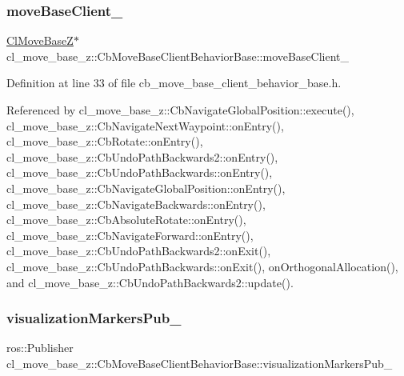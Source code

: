 \subsubsection{\texorpdfstring{move\+Base\+Client\+\_\+}{moveBaseClient\_}}
{\footnotesize\ttfamily \hyperlink{classcl__move__base__z_1_1ClMoveBaseZ}{Cl\+Move\+BaseZ}$\ast$ cl\+\_\+move\+\_\+base\+\_\+z\+::\+Cb\+Move\+Base\+Client\+Behavior\+Base\+::move\+Base\+Client\+\_\+\hspace{0.3cm}{\ttfamily [protected]}}



Definition at line 33 of file cb\+\_\+move\+\_\+base\+\_\+client\+\_\+behavior\+\_\+base.\+h.



Referenced by cl\+\_\+move\+\_\+base\+\_\+z\+::\+Cb\+Navigate\+Global\+Position\+::execute(), cl\+\_\+move\+\_\+base\+\_\+z\+::\+Cb\+Navigate\+Next\+Waypoint\+::on\+Entry(), cl\+\_\+move\+\_\+base\+\_\+z\+::\+Cb\+Rotate\+::on\+Entry(), cl\+\_\+move\+\_\+base\+\_\+z\+::\+Cb\+Undo\+Path\+Backwards2\+::on\+Entry(), cl\+\_\+move\+\_\+base\+\_\+z\+::\+Cb\+Undo\+Path\+Backwards\+::on\+Entry(), cl\+\_\+move\+\_\+base\+\_\+z\+::\+Cb\+Navigate\+Global\+Position\+::on\+Entry(), cl\+\_\+move\+\_\+base\+\_\+z\+::\+Cb\+Navigate\+Backwards\+::on\+Entry(), cl\+\_\+move\+\_\+base\+\_\+z\+::\+Cb\+Absolute\+Rotate\+::on\+Entry(), cl\+\_\+move\+\_\+base\+\_\+z\+::\+Cb\+Navigate\+Forward\+::on\+Entry(), cl\+\_\+move\+\_\+base\+\_\+z\+::\+Cb\+Undo\+Path\+Backwards2\+::on\+Exit(), cl\+\_\+move\+\_\+base\+\_\+z\+::\+Cb\+Undo\+Path\+Backwards\+::on\+Exit(), on\+Orthogonal\+Allocation(), and cl\+\_\+move\+\_\+base\+\_\+z\+::\+Cb\+Undo\+Path\+Backwards2\+::update().

\mbox{\label{classcl__move__base__z_1_1CbMoveBaseClientBehaviorBase_aff48fc567ae025b196efd8895b7fb35d}} 
\subsubsection{\texorpdfstring{visualization\+Markers\+Pub\+\_\+}{visualizationMarkersPub\_}}
{\footnotesize\ttfamily ros\+::\+Publisher cl\+\_\+move\+\_\+base\+\_\+z\+::\+Cb\+Move\+Base\+Client\+Behavior\+Base\+::visualization\+Markers\+Pub\+\_\+\hspace{0.3cm}{\ttfamily [protected]}}



